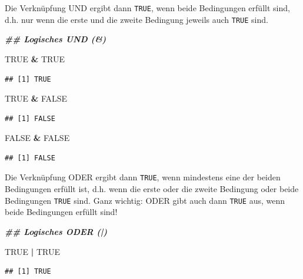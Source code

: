 \documentclass[
  ngerman,
]{book}
\newenvironment{Shaded}{\begin{snugshade}}{\end{snugshade}}
\newcommand{\ConstantTok}[1]{\textcolor[rgb]{0.56,0.35,0.01}{#1}}
\newcommand{\DocumentationTok}[1]{\textcolor[rgb]{0.56,0.35,0.01}{\textbf{\textit{#1}}}}
\newcommand{\SpecialCharTok}[1]{\textcolor[rgb]{0.81,0.36,0.00}{\textbf{#1}}}
\begin{document}
Die Verknüpfung UND ergibt dann \texttt{TRUE}, wenn beide Bedingungen erfüllt sind, d.h. nur wenn die erste und die zweite Bedingung jeweils auch \texttt{TRUE} sind.

\begin{Shaded}
\begin{Highlighting}[]
\DocumentationTok{\#\# Logisches UND (\&)}

\ConstantTok{TRUE} \SpecialCharTok{\&} \ConstantTok{TRUE}
\end{Highlighting}
\end{Shaded}

\begin{verbatim}
## [1] TRUE
\end{verbatim}

\begin{Shaded}
\begin{Highlighting}[]
\ConstantTok{TRUE} \SpecialCharTok{\&} \ConstantTok{FALSE}
\end{Highlighting}
\end{Shaded}

\begin{verbatim}
## [1] FALSE
\end{verbatim}

\begin{Shaded}
\begin{Highlighting}[]
\ConstantTok{FALSE} \SpecialCharTok{\&} \ConstantTok{FALSE}
\end{Highlighting}
\end{Shaded}

\begin{verbatim}
## [1] FALSE
\end{verbatim}

Die Verknüpfung ODER ergibt dann \texttt{TRUE}, wenn mindestens eine der beiden Bedingungen erfüllt ist, d.h. wenn die erste oder die zweite Bedingung oder beide Bedingungen \texttt{TRUE} sind. Ganz wichtig: ODER gibt auch dann \texttt{TRUE} aus, wenn beide Bedingungen erfüllt sind!

\begin{Shaded}
\begin{Highlighting}[]
\DocumentationTok{\#\# Logisches ODER (|)}

\ConstantTok{TRUE} \SpecialCharTok{|} \ConstantTok{TRUE}
\end{Highlighting}
\end{Shaded}

\begin{verbatim}
## [1] TRUE
\end{verbatim}
\end{document}
